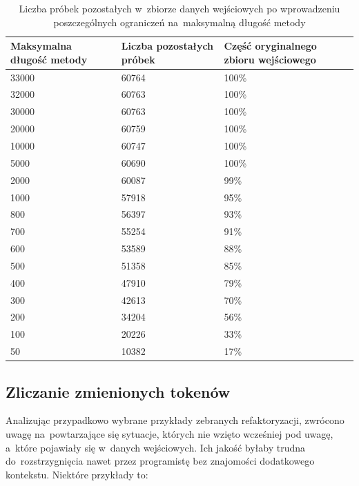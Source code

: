 \documentclass[twoside]{praca}
\begin{document}
\begin{table}[h]
\centering
\caption{Liczba próbek pozostałych w~zbiorze danych wejściowych po wprowadzeniu poszczególnych ograniczeń na~maksymalną długość metody}
\label{tbl:learn:max-len}
\begin{tabular}{|p{}|p{}|p{}|}
  \hline 
  \textbf{Maksymalna długość metody} & \textbf{Liczba pozostałych próbek} & \textbf{Część oryginalnego zbioru wejściowego} \\ \hline
  33000 & 60764 & 100\% \\ \hline
  32000 & 60763 & 100\% \\ \hline
  30000 & 60763 & 100\% \\ \hline
  20000 & 60759 & 100\% \\ \hline
  10000 & 60747 & 100\% \\ \hline
  5000 & 60690 & 100\% \\ \hline
  2000 & 60087 & 99\% \\ \hline
  1000 & 57918 & 95\% \\ \hline
  800 & 56397 & 93\% \\ \hline
  700 & 55254 & 91\% \\ \hline
  600 & 53589 & 88\% \\ \hline
  500 & 51358 & 85\% \\ \hline
  400 & 47910 & 79\% \\ \hline
  300 & 42613 & 70\% \\ \hline
  200 & 34204 & 56\% \\ \hline
  100 & 20226 & 33\% \\ \hline
  50 & 10382 & 17\% \\ \hline
\end{tabular} 
\end{table}



\subsection{Zliczanie zmienionych tokenów}

Analizując przypadkowo wybrane przykłady zebranych refaktoryzacji, zwrócono uwagę na~powtarzające się sytuacje, których nie wzięto wcześniej pod uwagę, a~które pojawiały się w~danych wejściowych. Ich jakość byłaby trudna do~rozstrzygnięcia nawet przez programistę bez znajomości dodatkowego kontekstu. Niektóre przykłady to:
\end{document}
